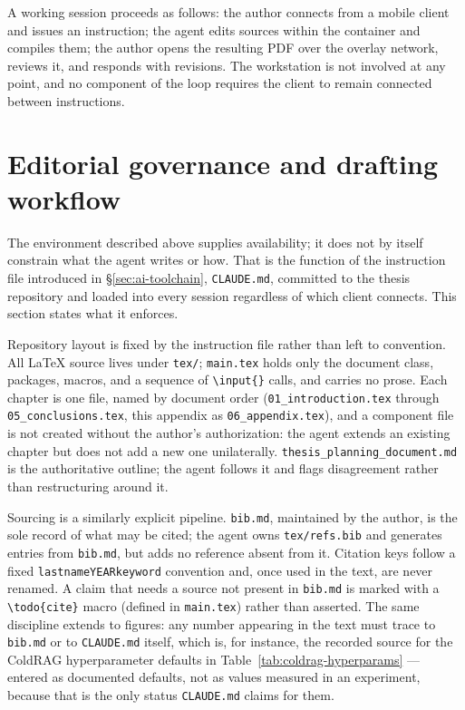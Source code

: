 A working session proceeds as follows: the author connects from a mobile client and issues an instruction; the agent edits sources within the container and compiles them; the author opens the resulting PDF over the overlay network, reviews it, and responds with revisions. The workstation is not involved at any point, and no component of the loop requires the client to remain connected between instructions.

\section{Editorial governance and drafting workflow}
\label{sec:ai-editorial}

The environment described above supplies availability; it does not by itself constrain what the agent writes or how. That is the function of the instruction file introduced in \S\ref{sec:ai-toolchain}, \texttt{CLAUDE.md}, committed to the thesis repository and loaded into every session regardless of which client connects. This section states what it enforces.

Repository layout is fixed by the instruction file rather than left to convention. All \LaTeX{} source lives under \texttt{tex/}; \texttt{main.tex} holds only the document class, packages, macros, and a sequence of \texttt{\textbackslash input\{\}} calls, and carries no prose. Each chapter is one file, named by document order (\texttt{01\_introduction.tex} through \texttt{05\_conclusions.tex}, this appendix as \texttt{06\_appendix.tex}), and a component file is not created without the author's authorization: the agent extends an existing chapter but does not add a new one unilaterally. \texttt{thesis\_planning\_document.md} is the authoritative outline; the agent follows it and flags disagreement rather than restructuring around it.

Sourcing is a similarly explicit pipeline. \texttt{bib.md}, maintained by the author, is the sole record of what may be cited; the agent owns \texttt{tex/refs.bib} and generates entries from \texttt{bib.md}, but adds no reference absent from it. Citation keys follow a fixed \texttt{lastnameYEARkeyword} convention and, once used in the text, are never renamed. A claim that needs a source not present in \texttt{bib.md} is marked with a \texttt{\textbackslash todo\{cite\}} macro (defined in \texttt{main.tex}) rather than asserted. The same discipline extends to figures: any number appearing in the text must trace to \texttt{bib.md} or to \texttt{CLAUDE.md} itself, which is, for instance, the recorded source for the ColdRAG hyperparameter defaults in Table~\ref{tab:coldrag-hyperparams} --- entered as documented defaults, not as values measured in an experiment, because that is the only status \texttt{CLAUDE.md} claims for them.

